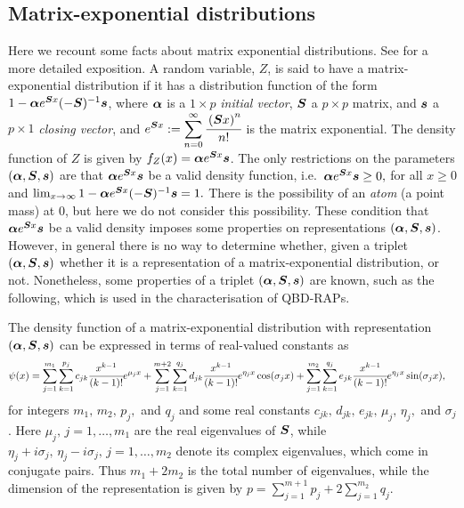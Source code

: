 \subsection{Matrix-exponential distributions}
Here we recount some facts about matrix exponential distributions. See \citep{MEinAP} for a more detailed exposition. A random variable, \(Z\), is said to have a matrix-exponential distribution if it has a distribution function of the form \(1-\boldsymbol \alpha e^{\boldsymbol Sx}(-\boldsymbol S)^{-1}\boldsymbol s\), where \(\boldsymbol \alpha\) is a \(1\times p\) \emph{initial vector}, \(\boldsymbol S\) a \(p\times p\) matrix, and \(\boldsymbol s\) a \(p\times 1\) \emph{closing vector}, and \(\displaystyle e^{\boldsymbol S x} := \sum_{n=0}^\infty \cfrac{\left(\boldsymbol Sx\right)^n}{n!}\) is the matrix exponential. The density function of \(Z\) is given by \(f_Z(x) = \boldsymbol\alpha e^{\boldsymbol S x}\boldsymbol s\). The only restrictions on the parameters \((\boldsymbol \alpha, \boldsymbol S, \boldsymbol s)\) are that \(\boldsymbol \alpha e^{\boldsymbol S x} \boldsymbol s\) be a valid density function, i.e.~\(\boldsymbol \alpha e^{\boldsymbol S x} \boldsymbol s\geq 0,\) for all \(x\geq 0\) and \(\lim_{x\to\infty} 1-\boldsymbol \alpha e^{\boldsymbol Sx}(-\boldsymbol S)^{-1}\boldsymbol s = 1.\) There is the possibility of an \emph{atom} (a point mass) at 0, but here we do not consider this possibility. These condition that \(\boldsymbol \alpha e^{\boldsymbol Sx}\boldsymbol s\) be a valid density imposes some properties on representations \((\boldsymbol \alpha, \boldsymbol S, \boldsymbol s)\). However, in general there is no way to determine whether, given a triplet \((\boldsymbol \alpha, \boldsymbol S, \boldsymbol s)\) whether it is a representation of a matrix-exponential distribution, or not. Nonetheless, some properties of a triplet \((\boldsymbol \alpha, \boldsymbol S, \boldsymbol s)\) are known, such as the following, which is used in the characterisation of QBD-RAPs. 
\begin{thm}
	The density function of a matrix-exponential distribution with representation \((\boldsymbol\alpha, \boldsymbol S, \boldsymbol s)\) can be expressed in terms of real-valued constants as 
	\begin{align}
		\psi(x)&=\sum_{j=1}^{m_1} \sum_{k=1}^{p_j} c_{jk} \cfrac{x^{k-1}}{(k-1)!} e^{\mu_jx} + \sum_{j=1}^{m+2}\sum_{k=1}^{q_j} d_{jk}\cfrac{x^{k-1}}{(k-1)!}e^{\eta_jx}\cos(\sigma_jx) + \sum_{j=1}^{m_2}\sum_{k=1}^{q_j}e_{jk}\cfrac{x^{k-1}}{(k-1)!}e^{\eta_jx}\sin(\sigma_jx), \label{eqn: spec}
	\end{align}
	for integers \(m_1,\,m_2,\,p_j,\) and \(q_j\) and some real constants \(c_{jk},\,d_{jk},\,e_{jk},\,\mu_j,\,\eta_j,\) and \(\sigma_j\). Here \(\mu_j,\, j=1,\dots,m_1\) are the real eigenvalues of \(\boldsymbol S\), while \(\eta_j+i\sigma_j, \, \eta_j-i\sigma_j,\, j=1,\dots,m_2\) denote its complex eigenvalues, which come in conjugate pairs. Thus \(m_1+2m_2\) is the total number of eigenvalues, while the dimension of the representation is given by \(\displaystyle p=\sum_{j=1}^{m+1}p_j + 2\sum_{j=1}^{m_2}q_j\). 
\end{thm}
